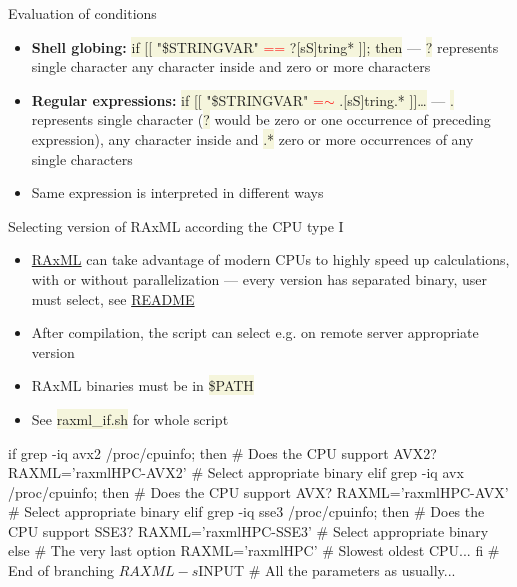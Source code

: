 \documentclass[compress, ucs, xelatex, 11pt, xcolor=svgnames, aspectratio=169,
	hyperref={
		bookmarks=true,
		unicode=true,
		colorlinks=true,
		pdftitle={Linux, command line and MetaCentrum},
		plainpages=false,
		pdfauthor={Vojtech Zeisek},
		pdfsubject={Course about use of Linux command line, writing shell scripts and using MetaCentrum of CESNET},
		pdfcreator={XeLaTeX},
		pdfkeywords={Linux, GNU, BASH, shell, command line, MetaCentrum},
		linkcolor=DarkRed, %
		anchorcolor=DarkBlue, %
		citecolor=Indigo, %
		filecolor=NavyBlue, %
		menucolor=DarkMagenta, %
		urlcolor=DarkBlue, %
		pdftex},
	url={hyphens, lowtilde} %
	]{beamer}
\renewcommand{\texttt}[1]{\colorbox{Beige}{{\ttfamily #1}}}
\renewcommand{\alert}[1]{\textcolor{red}{#1}}
\begin{document}
\begin{frame}[allowframebreaks]{Evaluation of conditions}
\begin{itemize}
		\begin{itemize}
			\item \textbf{Shell globing:} \texttt{if [[ "\$\textbraceleft STRINGVAR\textbraceright " \alert{==} ?[sS]tring* ]]; then} --- \texttt{?} represents single character \texttt{[]} any character inside and \texttt{*} zero or more characters
			\item \textbf{Regular expressions:} \texttt{if [[ "\$\textbraceleft STRINGVAR\textbraceright " \alert{=$\sim$} .[sS]tring.* ]]\ldots} --- \texttt{.} represents single character (\texttt{?} would be zero or one occurrence of preceding expression), \texttt{[]} any character inside and \texttt{.*} zero or more occurrences of any single characters
			\item Same expression is interpreted in different ways
		\end{itemize}
	\end{itemize}
\end{frame}

\begin{frame}[fragile]{Selecting version of RAxML according the CPU type I} %
	\begin{itemize}
		\item \href{https://github.com/stamatak/standard-RAxML}{RAxML} can take advantage of modern CPUs to highly speed up calculations, with or without parallelization --- every version has separated binary, user must select, see \href{https://github.com/stamatak/standard-RAxML/blob/master/README}{README}
		\item After compilation, the script can select e.g. on remote server appropriate version
		\item RAxML binaries must be in \texttt{\$PATH}
		\item See \texttt{raxml\_if.sh} for whole script
	\end{itemize}
	\vfill
	\begin{bashcode}
    if grep -iq avx2 /proc/cpuinfo; then # Does the CPU support AVX2?
      RAXML='raxmlHPC-AVX2' # Select appropriate binary
      elif grep -iq avx /proc/cpuinfo; then # Does the CPU support AVX?
        RAXML='raxmlHPC-AVX' # Select appropriate binary
        elif grep -iq sse3 /proc/cpuinfo; then # Does the CPU support SSE3?
          RAXML='raxmlHPC-SSE3' # Select appropriate binary
          else # The very last option
            RAXML='raxmlHPC' # Slowest oldest CPU...
      fi # End of branching
    ${RAXML} -s ${INPUT} # All the parameters as usually...
	\end{bashcode}
\end{frame}
\end{document}
